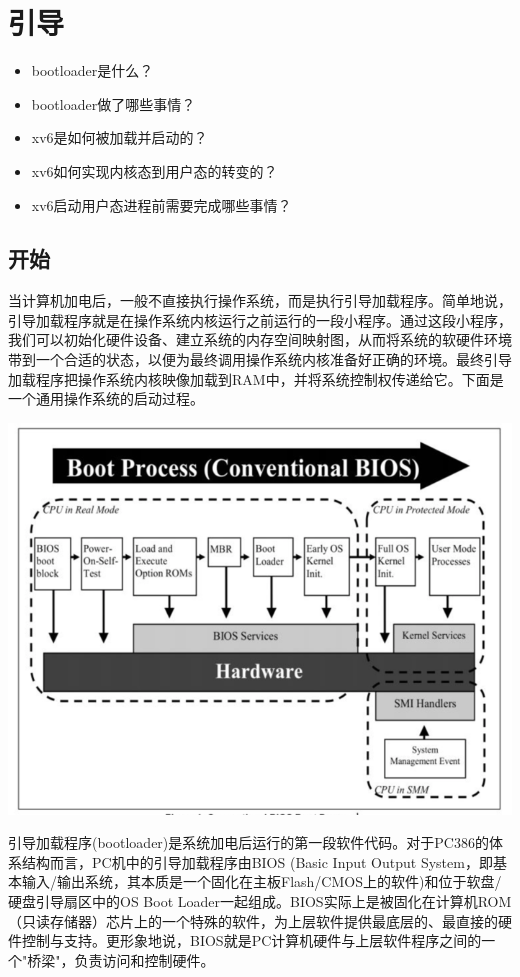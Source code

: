 \section{引导}

\begin{itemize}
\item bootloader是什么？
\item bootloader做了哪些事情？
\item xv6是如何被加载并启动的？
\item xv6如何实现内核态到用户态的转变的？
\item xv6启动用户态进程前需要完成哪些事情？
\end{itemize}

\subsection{开始}

当计算机加电后，一般不直接执行操作系统，而是执行引导加载程序。简单地说，引导加载程序就是在操作系统内核运行之前运行的一段小程序。通过这段小程序，我们可以初始化硬件设备、建立系统的内存空间映射图，从而将系统的软硬件环境带到一个合适的状态，以便为最终调用操作系统内核准备好正确的环境。最终引导加载程序把操作系统内核映像加载到RAM中，并将系统控制权传递给它。下面是一个通用操作系统的启动过程。

\includegraphics[width=6in]{figures/boot/fig1.png}


引导加载程序(bootloader)是系统加电后运行的第一段软件代码。对于PC386的体系结构而言，PC机中的引导加载程序由BIOS (Basic Input Output System，即基本输入/输出系统，其本质是一个固化在主板Flash/CMOS上的软件)和位于软盘/硬盘引导扇区中的OS Boot Loader一起组成。BIOS实际上是被固化在计算机ROM（只读存储器）芯片上的一个特殊的软件，为上层软件提供最底层的、最直接的硬件控制与支持。更形象地说，BIOS就是PC计算机硬件与上层软件程序之间的一个"桥梁"，负责访问和控制硬件。

